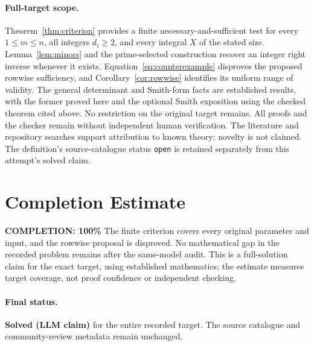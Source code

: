 \documentclass[11pt]{article}
\begin{document}
\paragraph{Full-target scope.}
Theorem~\ref{thm:criterion} provides a finite necessary-and-sufficient
test for every $1\le m\le n$, all integers $d_i\ge2$, and every
integral $X$ of the stated size. Lemma~\ref{lem:minors} and the
prime-selected construction recover an integer right inverse whenever
it exists. Equation~\eqref{eq:counterexample} disproves the proposed
rowwise sufficiency, and Corollary~\ref{cor:rowwise} identifies its
uniform range of validity. The general determinant and Smith-form
facts are established results, with the former proved here and the
optional Smith exposition using the checked theorem cited above.
No restriction on the original target remains. All proofs and the
checker remain without independent human verification. The literature
and repository searches support attribution to known theory; novelty
is not claimed. The definition's source-catalogue status \texttt{open}
is retained separately from this attempt's solved claim.

\section{Completion Estimate}
\noindent\textbf{COMPLETION: 100\%}
The finite criterion covers every original parameter and input, and the
rowwise proposal is disproved. No mathematical gap in the recorded
problem remains after the same-model audit. This is a full-solution
claim for the exact target, using established mathematics; the estimate
measures target coverage, not proof confidence or independent checking.

\paragraph{Final status.}
\textbf{Solved (LLM claim)} for the entire recorded target. The source
catalogue and community-review metadata remain unchanged.
\end{document}
